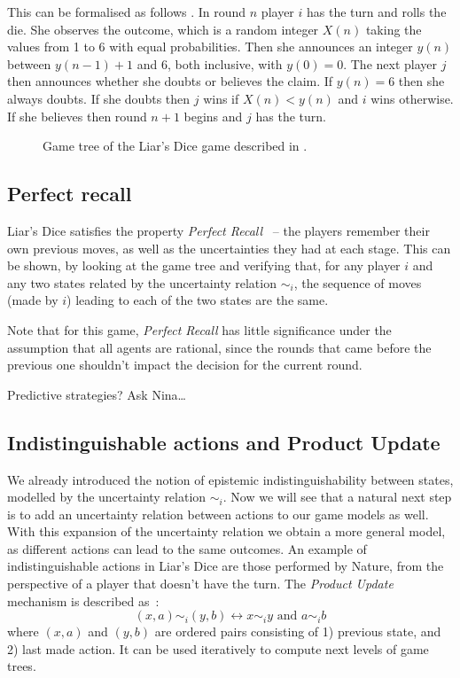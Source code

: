 This can be formalised as follows \cite{ferguson1991}. In round $n$ player $i$ has the turn and rolls the die. She observes the outcome, which is a random integer $X(n)$ taking the values from 1 to 6 with equal probabilities. Then she announces an integer $y(n)$ between $y(n-1)+1$ and 6, both inclusive, with $y(0) = 0$. The next player $j$ then announces whether she doubts or believes the claim. If $y(n)=6$ then she always doubts. If she doubts then $j$ wins if $X(n) < y(n)$ and $i$ wins otherwise. If she believes then round $n+1$ begins and $j$ has the turn.

\begin{figure}[htbp]
\centering

\caption{Game tree of the Liar's Dice game described in .}
\label{fig:liars-dice-tree}
\end{figure}

\subsection{Perfect recall}
Liar's Dice satisfies the property \emph{Perfect Recall}~\cite{benthem2001a} -- the players remember their own previous moves, as well as the uncertainties they had at each stage. This can be shown, by looking at the game tree and verifying that, for any player $i$ and any two states related by the uncertainty relation $\sim_i$, the sequence of moves (made by $i$) leading to each of the two states are the same. 

Note that for this game, \emph{Perfect Recall} has little significance under the assumption that all agents are rational, since the rounds that came before the previous one shouldn't impact the decision for the current round.

{ \color{red} Predictive strategies? Ask Nina\dots }

\subsection{Indistinguishable actions and Product Update}
We already introduced the notion of epistemic indistinguishability between states, modelled by the uncertainty relation $\sim_i$. Now we will see that a natural next step is to add an uncertainty relation between actions to our game models as well. With this expansion of the uncertainty relation we obtain a more general model, as different actions can lead to the same outcomes. An example of indistinguishable actions in Liar's Dice are those performed by Nature, from the perspective of a player that doesn't have the turn. The \emph{Product Update} mechanism is described as~\cite{benthem2001a}:
$$
(x,a)\sim_i(y,b) \leftrightarrow x\sim_i y \mbox{ and } a\sim_i b
$$
where $(x,a)$ and $(y,b)$ are ordered pairs consisting of 1) previous state, and 2) last made action. It can be used iteratively to compute next levels of game trees.

